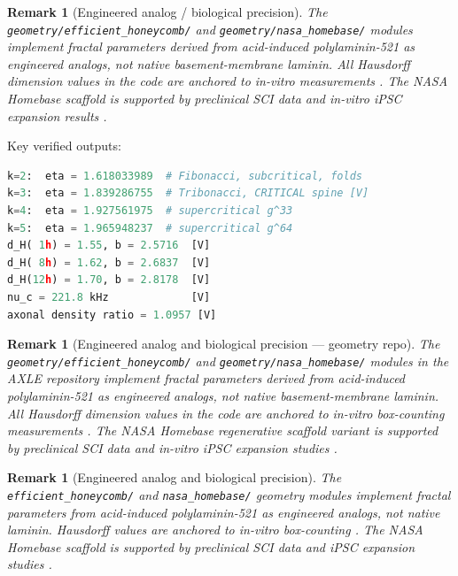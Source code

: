 \documentclass[12pt,a4paper]{article}
\newtheorem{remark}[theorem]{Remark}
\begin{document}
\begin{remark}[Engineered analog / biological precision]
The \texttt{geometry/efficient\_honeycomb/} and
\texttt{geometry/nasa\_homebase/} modules implement fractal parameters
derived from acid-induced polylaminin-521 \cite{mesquita2022} as
\emph{engineered analogs}, not native basement-membrane laminin.
All Hausdorff dimension values in the code are anchored to
in-vitro measurements \cite{hochman2014}. The NASA Homebase scaffold
is supported by preclinical SCI data \cite{menezes2010,chize2025}
and in-vitro iPSC expansion results \cite{mesquita2022}.
\end{remark}

Key verified outputs:
\begin{lstlisting}[language=Python,caption={knacci\_spine.py verified output}]
k=2:  eta = 1.618033989  # Fibonacci, subcritical, folds
k=3:  eta = 1.839286755  # Tribonacci, CRITICAL spine [V]
k=4:  eta = 1.927561975  # supercritical g^33
k=5:  eta = 1.965948237  # supercritical g^64
d_H( 1h) = 1.55, b = 2.5716  [V]
d_H( 8h) = 1.62, b = 2.6837  [V]
d_H(12h) = 1.70, b = 2.8178  [V]
nu_c = 221.8 kHz             [V]
axonal density ratio = 1.0957 [V]
\end{lstlisting}



\begin{remark}[Engineered analog and biological precision --- geometry repo]
The \texttt{geometry/efficient\_honeycomb/} and \texttt{geometry/nasa\_homebase/}
modules in the AXLE repository implement fractal parameters derived from
acid-induced polylaminin-521 \cite{mesquita2022} as \emph{engineered analogs},
not native basement-membrane laminin. All Hausdorff dimension values in the
code are anchored to in-vitro box-counting measurements \cite{hochman2014}.
The NASA Homebase regenerative scaffold variant is supported by preclinical
SCI data \cite{menezes2010,chize2025} and in-vitro iPSC expansion studies
\cite{mesquita2022}.
\end{remark}

\begin{remark}[Engineered analog and biological precision]
The \texttt{efficient\_honeycomb/} and \texttt{nasa\_homebase/} geometry modules
implement fractal parameters from acid-induced polylaminin-521 \cite{mesquita2022}
as \emph{engineered analogs}, not native laminin.
Hausdorff values are anchored to in-vitro box-counting \cite{hochman2014}.
The NASA Homebase scaffold is supported by preclinical SCI data
\cite{menezes2010,chize2025} and iPSC expansion studies \cite{mesquita2022}.
\end{remark}
\end{document}
